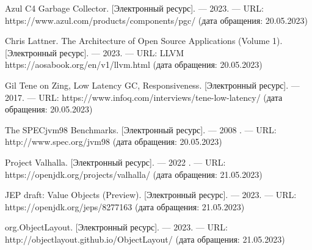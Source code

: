 \begin{flushleft}
\begin{thebibliography}{}
Azul C4 Garbage Collector. [Электронный ресурс]. --- 2023. --- URL: https://www.azul.com/products/components/pgc/ (дата обращения: 20.05.2023)

Chris Lattner. The Architecture of Open Source Applications (Volume 1). [Электронный ресурс]. --- 2023. --- URL: LLVM https://aosabook.org/en/v1/llvm.html (дата обращения: 20.05.2023)

Gil Tene on Zing, Low Latency GC, Responsiveness. [Электронный ресурс]. --- 2017. --- URL: https://www.infoq.com/interviews/tene-low-latency/ (дата обращения: 20.05.2023)

The SPECjvm98 Benchmarks. [Электронный ресурс]. --- 2008 . --- URL: http://www.spec.org/jvm98 (дата обращения: 20.05.2023)

Project Valhalla.  [Электронный ресурс]. --- 2022 . --- URL: https://openjdk.org/projects/valhalla/ (дата обращения: 21.05.2023)

JEP draft: Value Objects (Preview). [Электронный ресурс]. --- 2023. --- URL: https://openjdk.org/jeps/8277163 (дата обращения: 21.05.2023)

org.ObjectLayout. [Электронный ресурс]. --- 2023. --- URL: http://objectlayout.github.io/ObjectLayout/ (дата обращения: 21.05.2023)

\end{thebibliography}
\end{flushleft}
\endgroup

\clearpage
